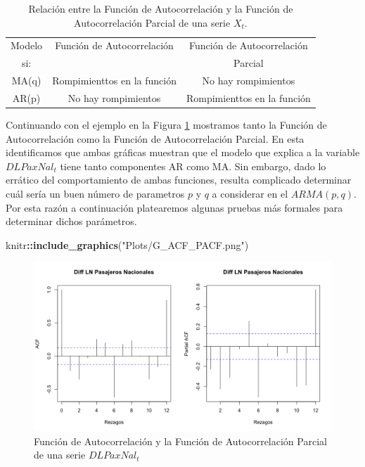 \documentclass[
]{book}
\newenvironment{Shaded}{\begin{snugshade}}{\end{snugshade}}
\newcommand{\FunctionTok}[1]{\textcolor[rgb]{0.13,0.29,0.53}{\textbf{#1}}}
\newcommand{\NormalTok}[1]{#1}
\newcommand{\SpecialCharTok}[1]{\textcolor[rgb]{0.81,0.36,0.00}{\textbf{#1}}}
\newcommand{\StringTok}[1]{\textcolor[rgb]{0.31,0.60,0.02}{#1}}
\begin{document}
\begin{table}
\centering
\begin{tabular}{| c | c | c |}
    \hline
    Modelo  & Función de Autocorrelación & Función de Autocorrelación \\
     si: &   & Parcial \\
    \hline
    MA(q) & Rompimienttos en la función & No hay rompimientos \\
    AR(p) & No hay rompimientos & Rompimienttos en la función \\
    \hline
\end{tabular}
\caption{Relación entre la Función de Autocorrelación y la Función de Autocorrelación Parcial de una serie $X_t$.}
\end{table}

Continuando con el ejemplo en la Figura \ref{fig:fig414} mostramos tanto la Función de Autocorrelación como la Función de Autocorrelación Parcial. En esta identificamos que ambas gráficas muestran que el modelo que explica a la variable \(DLPaxNal_t\) tiene tanto componentes AR como MA. Sin embargo, dado lo errático del comportamiento de ambas funciones, resulta complicado determinar cuál sería un buen número de parametros \(p\) y \(q\) a considerar en el \(ARMA(p,q)\). Por esta razón a continuación platearemos algunas pruebas más formales para determinar dichos parámetros.

\begin{Shaded}
\begin{Highlighting}[]
\NormalTok{knitr}\SpecialCharTok{::}\FunctionTok{include\_graphics}\NormalTok{(}\StringTok{"Plots/G\_ACF\_PACF.png"}\NormalTok{) }
\end{Highlighting}
\end{Shaded}

\begin{figure}

{\centering \includegraphics[width=0.95\linewidth]{Plots/G_ACF_PACF} 

}

\caption{Función de Autocorrelación y la Función de Autocorrelación Parcial de una serie $DLPaxNal_t$}\label{fig:fig414}
\end{figure}
\end{document}

